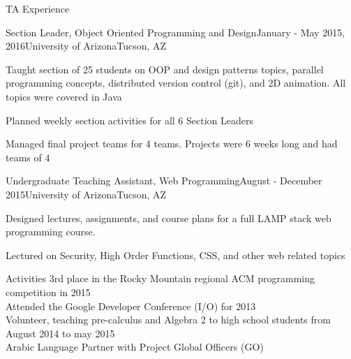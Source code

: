 \documentclass{resume} %
\begin{document}
\begin{rSection}{TA Experience}
	
	\begin{rSubsection}{Section Leader, Object Oriented Programming and Design}{January - May 2015, 2016}{University of Arizona}{Tucson, AZ}
		\item Taught section of 25 students on OOP and design patterns topics, parallel programming concepts, distributed version control (git), and 2D animation. All topics were covered in Java
		\item Planned weekly section activities for all 6 Section Leaders
		\item Managed final project teams for 4 teams. Projects were 6 weeks long and had teams of 4
	\end{rSubsection}
	\begin{rSubsection}{Undergraduate Teaching Assistant, Web Programming}{August - December 2015}{University of Arizona}{Tucson, AZ}
		\item Designed lectures, assignments, and course plans for a full LAMP stack web programming course. 
		\item Lectured on Security, High Order Functions, CSS, and other web related topics
	\end{rSubsection}
	
\end{rSection}


\begin{rSection}{Activities}
3rd place in the Rocky Mountain regional ACM programming competition in 2015 \\
Attended the Google Developer Conference (I/O) for 2013 \\
Volunteer, teaching pre-calculus and Algebra 2 to high school students from August 2014 to may 2015\\
Arabic Language Partner with Project Global Officers (GO) \\
\end{rSection}

\end{document}
